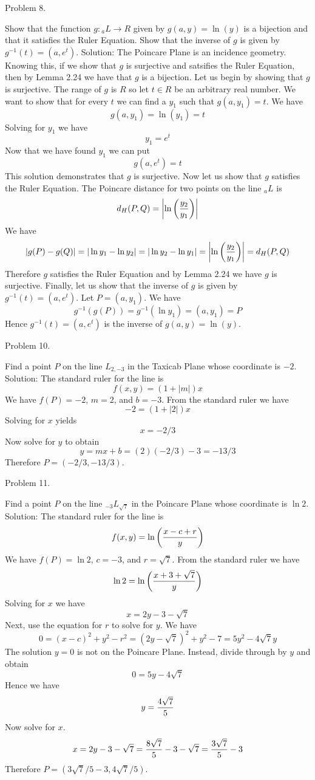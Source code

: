 \vfill
\eject

\beginsection Problem 8.

Show that the function $g:{}_aL\rightarrow R$ given by $g(a,y)=\ln(y)$ is a bijection
and that it satisfies the Ruler Equation. Show that the inverse of $g$ is given by
$g^{-1}(t)=(a,e^t)$.
\medskip
Solution: The Poincare Plane is an incidence geometry.
Knowing this, if we show that $g$ is surjective and satsifies the Ruler Equation,
then by Lemma 2.24 we have that $g$ is a bijection.
Let us begin by showing that $g$ is surjective.
The range of $g$ is $R$ so let $t\in R$ be an arbitrary real number.
We want to show that for every $t$ we can find a $y_1$ such that
$g(a,y_1)=t$.
We have
$$g(a,y_1)=\ln(y_1)=t$$
Solving for $y_1$ we have
$$y_1=e^t$$
Now that we have found $y_1$ we can put
$$g(a,e^t)=t$$
This solution demonstrates that $g$ is surjective.
Now let us show that $g$ satisfies the Ruler Equation.
The Poincare distance for two points on the line ${}_aL$ is
$$d_H(P,Q)=\left|\ln\left({y_2\over y_1}\right)\right|$$
We have
$$|g(P)-g(Q)|=|\ln y_1-\ln y_2|=|\ln y_2-\ln y_1|=\left|\ln\left({y_2\over y_1}\right)\right|
=d_H(P,Q)$$
Therefore $g$ satisfies the Ruler Equation and by Lemma 2.24 we have $g$ is surjective.
Finally, let us show that the inverse of $g$ is given by
$g^{-1}(t)=(a,e^t)$.
Let $P=(a,y_1)$. We have
$$g^{-1}(g(P))=g^{-1}(\ln y_1)=(a,y_1)=P$$
Hence $g^{-1}(t)=(a,e^t)$ is the inverse of $g(a,y)=\ln(y)$.

\vfill
\eject

\beginsection Problem 10.

Find a point $P$ on the line $L_{2,-3}$ in the Taxicab Plane whose coordinate is $-2$.
\medskip
Solution: The standard ruler for the line is
$$f(x,y)=(1+|m|)x$$
We have $f(P)=-2$, $m=2$, and $b=-3$.
From the standard ruler we have
$$-2=(1+|2|)x$$
Solving for $x$ yields
$$x=-2/3$$
Now solve for $y$ to obtain
$$y=mx+b=(2)(-2/3)-3=-13/3$$
Therefore $P=(-2/3,-13/3)$.

\beginsection Problem 11.

Find a point $P$ on the line ${}_{-3}L_{\sqrt7}$ in the Poincare Plane
whose coordinate is $\ln2$.
\medskip
Solution: The standard ruler for the line is
$$f(x,y)=\ln\left({x-c+r\over y}\right)$$
We have $f(P)=\ln2$, $c=-3$, and $r=\sqrt7$.
From the standard ruler we have
$$\ln2=\ln\left({x+3+\sqrt7\over y}\right)$$
Solving for $x$ we have
$$x=2y-3-\sqrt7$$
Next, use the equation for $r$ to solve for $y$. We have
$$0=(x-c)^2+y^2-r^2=(2y-\sqrt7)^2+y^2-7
=5y^2-4\sqrt7y$$
The solution $y=0$ is not on the Poincare Plane.
Instead, divide through by $y$ and obtain
$$0=5y-4\sqrt7$$
Hence we have
$$y={4\sqrt7\over5}$$
Now solve for $x$.
$$x=2y-3-\sqrt7={8\sqrt7\over5}-3-\sqrt7={3\sqrt7\over5}-3$$
Therefore $P=(3\sqrt7/5-3,4\sqrt7/5)$.

